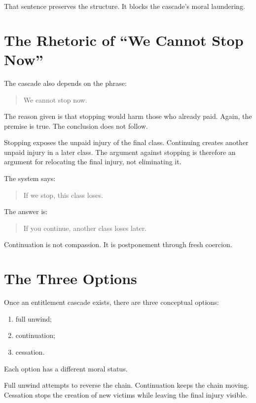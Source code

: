 \documentclass[12pt]{article}
\begin{document}
That sentence preserves the structure. It blocks the cascade's moral laundering.

\section{The Rhetoric of ``We Cannot Stop Now''}

The cascade also depends on the phrase:

\begin{quote}
We cannot stop now.
\end{quote}

The reason given is that stopping would harm those who already paid. Again, the premise is true. The conclusion does not follow.

Stopping exposes the unpaid injury of the final class. Continuing creates another unpaid injury in a later class. The argument against stopping is therefore an argument for relocating the final injury, not eliminating it.

The system says:

\begin{quote}
If we stop, this class loses.
\end{quote}

The answer is:

\begin{quote}
If you continue, another class loses later.
\end{quote}

Continuation is not compassion. It is postponement through fresh coercion.

\section{The Three Options}

Once an entitlement cascade exists, there are three conceptual options:

\begin{enumerate}
  \item full unwind;
  \item continuation;
  \item cessation.
\end{enumerate}

Each option has a different moral status.

Full unwind attempts to reverse the chain. Continuation keeps the chain moving. Cessation stops the creation of new victims while leaving the final injury visible.
\end{document}
